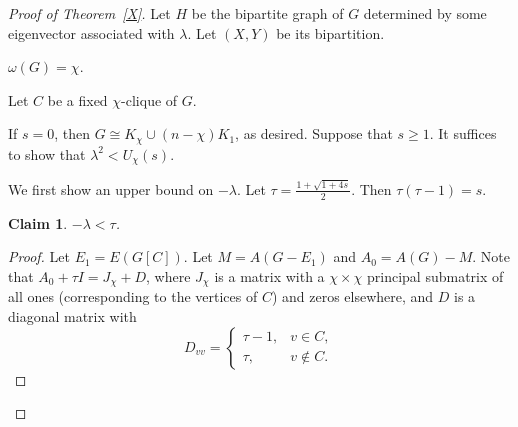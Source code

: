 \documentclass[10pt,a4paper]{amsart}
\newtheorem{claim}{Claim}[section]
\begin{document}
\begin{proof}[Proof of Theorem~\ref{X}]
 

Let $H$ be the bipartite graph of $G$ determined by some eigenvector associated with $\lambda$. Let $(X,Y)$ be its bipartition.

 $\omega(G)=\chi$.



Let $C$ be a fixed $\chi$-clique of $G$.

If $s=0$, then $G\cong K_\chi\cup (n-\chi) K_1$, as desired. Suppose that $s\ge 1$.   
It suffices to show that $\lambda^2 <U_\chi(s)$.

We first show an upper bound on $-\lambda$. Let $\tau = \frac{1+\sqrt{1+4s}}{2}$. Then $\tau(\tau-1)=s$.
\begin{claim}\label{c1}
$-\lambda< \tau$. %
\end{claim}
\begin{proof}
Let $E_1=E(G[C])$. Let $M=A(G-E_1)$ and $A_0=A(G)-M$. 
Note that $A_0 + \tau I = J_\chi + D$, where $J_\chi$ is a matrix with a $\chi\times \chi$ principal submatrix of all  ones (corresponding to the vertices of $C$) and zeros elsewhere, and $D$ is a diagonal matrix with \[
D_{vv}=\begin{cases}
\tau-1, & v\in C,\\
\tau, & v\notin C.
\end{cases}
\]


\end{proof}
\end{proof}
\end{document}
